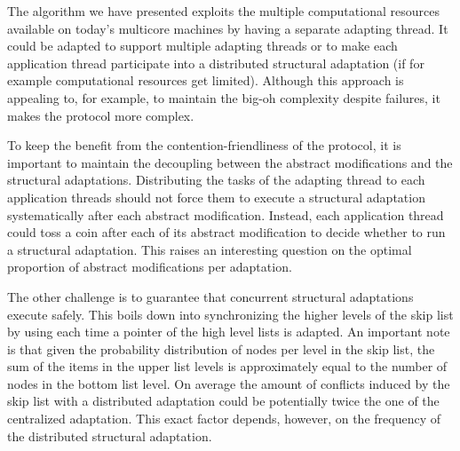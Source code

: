 
The algorithm we have presented exploits the multiple computational resources available on 
today's multicore machines by having a separate adapting thread. 
It could be adapted to support multiple adapting threads or to make each application thread participate 
into a distributed structural adaptation (if for example computational resources get limited). 
Although this 
approach is appealing to, for example, to maintain the big-oh complexity despite failures, it makes the protocol more 
complex.

To keep the benefit from the contention-friendliness of the 
protocol, it is important to maintain the decoupling between the abstract 
modifications and the structural adaptations. 
Distributing the tasks of the adapting thread to each application threads should not force them to  
execute a structural adaptation systematically after each abstract modification.
Instead, each application thread could toss a coin after each of its 
abstract modification to decide whether to run a structural adaptation.
This raises an interesting question on the optimal proportion of abstract 
modifications per adaptation.


The other challenge is to guarantee that concurrent structural adaptations execute safely.
This boils down into synchronizing the higher levels of the skip list by using \CAS{}
each time a pointer of the high level lists is adapted. 
An important note is that given the probability distribution of nodes per level in the skip list, the sum 
of the items in the upper list levels is approximately equal to the number of nodes in the bottom 
list level. On average the amount of conflicts induced by the skip list with a distributed adaptation 
could be potentially twice the one of the centralized adaptation. This exact factor depends, 
however, on the frequency of the distributed structural adaptation.

